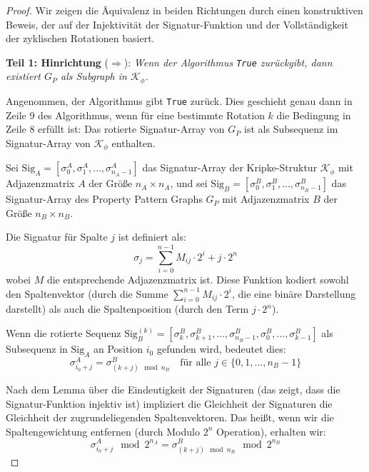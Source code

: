 ﻿\documentclass[a4paper,12pt]{article}
\theoremstyle{definition}
\begin{document}
\begin{proof}
Wir zeigen die Äquivalenz in beiden Richtungen durch einen konstruktiven Beweis, der auf der Injektivität der Signatur-Funktion und der Vollständigkeit der zyklischen Rotationen basiert.

\textbf{Teil 1: Hinrichtung} ($\Rightarrow$): \textit{Wenn der Algorithmus \texttt{True} zurückgibt, dann existiert $G_P$ als Subgraph in $\mathcal{K}_{\phi}$.}

Angenommen, der Algorithmus gibt \texttt{True} zurück. Dies geschieht genau dann in Zeile 9 des Algorithmus, wenn für eine bestimmte Rotation $k$ die Bedingung in Zeile 8 erfüllt ist: Das rotierte Signatur-Array von $G_P$ ist als Subsequenz im Signatur-Array von $\mathcal{K}_{\phi}$ enthalten.

Sei $\text{Sig}_A = [\sigma_0^A, \sigma_1^A, \ldots, \sigma_{n_A-1}^A]$ das Signatur-Array der Kripke-Struktur $\mathcal{K}_{\phi}$ mit Adjazenzmatrix $A$ der Größe $n_A \times n_A$, und sei $\text{Sig}_B = [\sigma_0^B, \sigma_1^B, \ldots, \sigma_{n_B-1}^B]$ das Signatur-Array des Property Pattern Graphs $G_P$ mit Adjazenzmatrix $B$ der Größe $n_B \times n_B$.

Die Signatur für Spalte $j$ ist definiert als:
\begin{equation}
\sigma_j = \sum_{i=0}^{n-1} M_{ij} \cdot 2^i + j \cdot 2^n
\end{equation}
wobei $M$ die entsprechende Adjazenzmatrix ist. Diese Funktion kodiert sowohl den Spaltenvektor (durch die Summe $\sum_{i=0}^{n-1} M_{ij} \cdot 2^i$, die eine binäre Darstellung darstellt) als auch die Spaltenposition (durch den Term $j \cdot 2^n$).

Wenn die rotierte Sequenz $\text{Sig}_B^{(k)} = [\sigma_k^B, \sigma_{k+1}^B, \ldots, \sigma_{n_B-1}^B, \sigma_0^B, \ldots, \sigma_{k-1}^B]$ als Subsequenz in $\text{Sig}_A$ an Position $i_0$ gefunden wird, bedeutet dies:
\begin{equation}
\sigma_{i_0+j}^A = \sigma_{(k+j) \mod n_B}^B \quad \text{für alle } j \in \{0, 1, \ldots, n_B-1\}
\end{equation}

Nach dem Lemma über die Eindeutigkeit der Signaturen (das zeigt, dass die Signatur-Funktion injektiv ist) impliziert die Gleichheit der Signaturen die Gleichheit der zugrundeliegenden Spaltenvektoren. Das heißt, wenn wir die Spaltengewichtung entfernen (durch Modulo $2^n$ Operation), erhalten wir:
\begin{equation}
\sigma_{i_0+j}^A \mod 2^{n_A} = \sigma_{(k+j) \mod n_B}^B \mod 2^{n_B}
\end{equation}


\end{proof}
\end{document}
